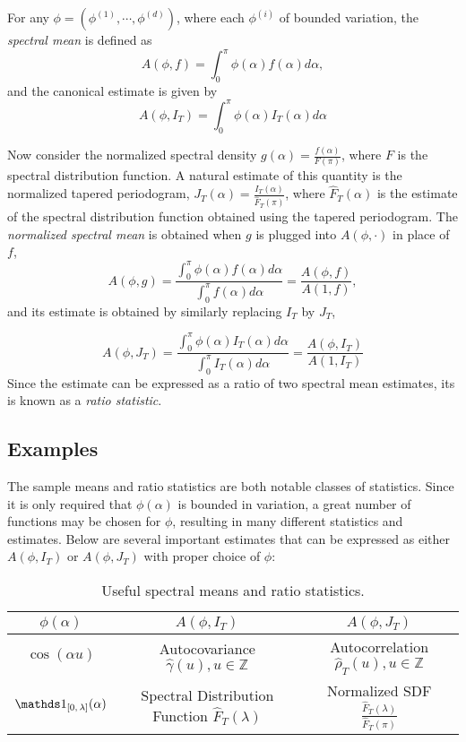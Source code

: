 For any $\phi = (\phi^{(1)},\cdots,\phi^{(d)})$, where each $\phi^{(i)}$ of bounded variation, the \textit{spectral mean} is defined as
	\[
	A(\phi, f) = \int_0^\pi \phi(\alpha)f(\alpha)d\alpha,
	\]
and the canonical estimate is given by
	\[
	A(\phi,I_T) = \int_0^\pi \phi(\alpha)I_T(\alpha)d\alpha
	\]

Now consider the normalized spectral density $g(\alpha) = \frac{f(\alpha)}{F(\pi)}$, where $F$ is the spectral distribution function. A natural estimate of this quantity is the normalized tapered periodogram, $J_T(\alpha)=\frac{I_T(\alpha)}{\hat{F}_T(\pi)}$, where $\hat{F}_T(\alpha)$ is the estimate of the spectral distribution function obtained using the tapered periodogram. The \textit{normalized spectral mean} is obtained when $g$ is plugged into $A(\phi,\cdot)$ in place of $f$,
	\[
	 A(\phi,g)=\frac{\int_0^\pi \phi(\alpha)f(\alpha)d\alpha}{\int_0^\pi f(\alpha)d\alpha} = \frac{A(\phi,f)}{A(1,f)},
	\]
and its estimate is obtained by similarly replacing $I_T$ by $J_T$,

	\[
	 A(\phi,J_T)=\frac{\int_0^\pi \phi(\alpha)I_T(\alpha)d\alpha}{\int_0^\pi I_T(\alpha)d\alpha} = \frac{A(\phi,I_T)}{A(1,I_T)}
	\]
Since the estimate can be expressed as a ratio of two spectral mean estimates, its is known as a \textit{ratio statistic}.


\subsection*{Examples}

The sample means and ratio statistics are both notable classes of statistics. Since it is only required that $\phi(\alpha)$ is bounded in variation, a great number of functions may be chosen for $\phi$, resulting in many different statistics and estimates. Below are several important estimates that can be expressed as either $A(\phi, I_T)$ or $A(\phi, J_T)$ with proper choice of $\phi$:\\

\begin{table}
\centering
\begin{tabular}{ccc}
\toprule
$\phi(\alpha)$ & $A(\phi,I_T)$ & $A(\phi,J_T)$ \\
\midrule
$\cos(\alpha u)$ & Autocovariance $\hat{\gamma}(u), u \in \mathbb{Z}$  &  Autocorrelation $\hat{\rho}_T(u), u \in \mathbb{Z}$ \\
$\on{[0,\lambda]}(\alpha)$ & Spectral Distribution Function $\hat{F}_T(\lambda)$ & Normalized SDF $\frac{\hat{F}_T(\lambda)}{\hat{F}_T(\pi)}$\\
\bottomrule
\end{tabular}
\caption{Useful spectral means and ratio statistics.}
\end{table}


